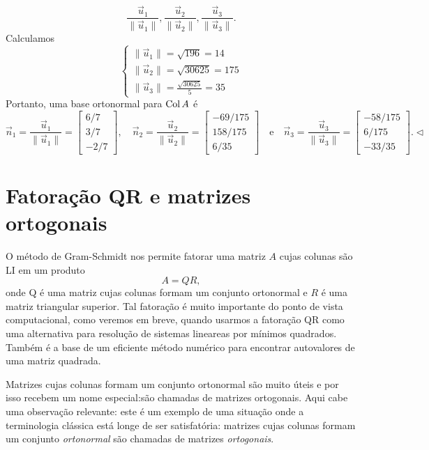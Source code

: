 \documentclass[../livro.tex]{subfiles}  %
\begin{document}
\begin{example}
\[
\frac{\vec{u}_1}{\|\vec{u}_1\|}, \frac{\vec{u}_2}{\|\vec{u}_2\|}, \frac{\vec{u}_3}{\|\vec{u}_3\|}.
\] Calculamos
\[
\left\{
  \begin{array}{ll}
   \|\vec{u}_1\| = \sqrt{196} = 14 \\
   \|\vec{u}_2\| = \sqrt{30625} = 175 \\
   \|\vec{u}_3\| = \frac{\sqrt{30625}}{5} = 35
  \end{array}
\right.
\] Portanto, uma base ortonormal para $\operatorname{Col} A$ é
\[
\vec{n}_1 = \frac{\vec{u}_1}{\|\vec{u}_1\|} =
\begin{bmatrix}
 6/7  \\
 3/7  \\
 -2/7
\end{bmatrix}, \quad
\vec{n}_2 = \frac{\vec{u}_2}{\|\vec{u}_2\|} =
\begin{bmatrix}
 -69/175  \\
 158/175  \\
 6/35
\end{bmatrix} \quad \text{e} \quad
\vec{n}_3 = \frac{\vec{u}_3}{\|\vec{u}_3\|} =
\begin{bmatrix}
 -58/175  \\
 6/175  \\
 -33/35
\end{bmatrix}. \lhd
\]
\end{example}


\section{Fatoração QR e matrizes ortogonais}


O método de Gram-Schmidt nos permite fatorar uma matriz $A$ cujas colunas são LI em um produto \[A=QR,\] onde Q é uma matriz cujas colunas formam um conjunto ortonormal e $R$ é uma matriz triangular superior. Tal fatoração é muito importante do ponto de vista computacional, como veremos em breve, quando usarmos a fatoração QR como uma alternativa  para resolução de sistemas lineareas por mínimos quadrados. Também é a base de um eficiente método numérico para encontrar autovalores de uma matriz quadrada.

Matrizes cujas colunas formam um conjunto ortonormal são muito úteis e por isso recebem um nome especial:são chamadas de matrizes ortogonais. Aqui cabe uma observação relevante: este é um exemplo de uma situação onde a terminologia clássica está longe de ser satisfatória: matrizes  cujas colunas formam um conjunto {\it ortonormal} são chamadas de matrizes {\it ortogonais}.   
\end{document}
